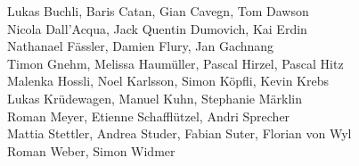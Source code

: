 %
%
%
Lukas Buchli,		%
Baris Catan,		%
Gian Cavegn,		%
Tom Dawson%
\\
Nicola Dall'Acqua,	%
Jack Quentin Dumovich,	%
Kai Erdin%
\\
Nathanael Fässler,	%
Damien Flury,		%
Jan Gachnang%
\\
Timon Gnehm,		%
Melissa Haumüller,	%
Pascal Hirzel,		%
Pascal Hitz%
\\
Malenka Hossli,		%
Noel Karlsson,		%
Simon Köpfli,		%
Kevin Krebs%
\\
Lukas Krüdewagen,	%
Manuel Kuhn,		%
Stephanie Märklin%
\\
Roman Meyer,		%
Etienne Schafflützel,	%
Andri Sprecher%
\\
Mattia Stettler,	%
Andrea Studer,		%
Fabian Suter,		%
Florian von Wyl%
\\
Roman Weber,		%
Simon Widmer%
